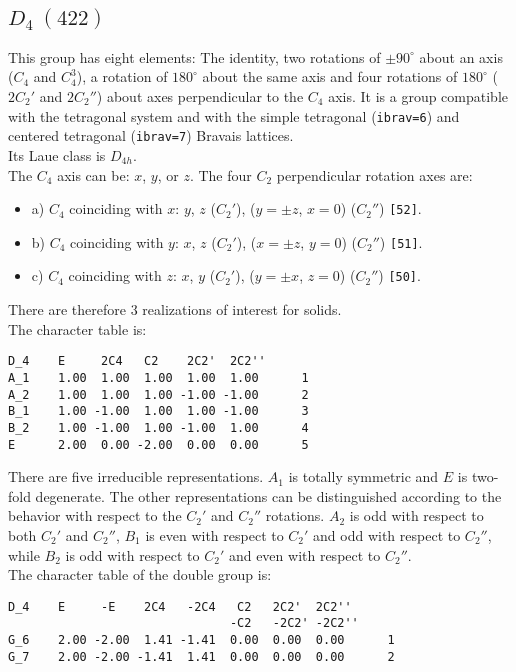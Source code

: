 \documentclass[12pt,a4paper]{article}
\begin{document}
\subsection{\color{web-blue}$D_4\ (422)$} 
This group has eight elements: The identity, two rotations of 
$\pm90^\circ$ about
an axis ($C_4$ and $C_4^3$), a rotation of $180^\circ$ about the same axis and
four rotations of $180^\circ$ ($2C_2'$ and $2C_2''$) about axes perpendicular 
to the $C_4$ axis. It is a group compatible with the tetragonal system and with the
simple tetragonal (\texttt{ibrav=6}) and centered tetragonal (\texttt{ibrav=7})
Bravais lattices. \\ 
Its Laue class is $D_{4h}$. \\
The $C_4$ axis can be: $x$, $y$, or $z$. The four $C_2$ perpendicular rotation
axes are: 
\begin{itemize}
\item
a) $C_4$ coinciding with $x$: $y$, $z$ ($C_2'$), ($y=\pm z$, $x=0$) ($C_2''$)
\texttt{[52]}.
\item
b) $C_4$ coinciding with $y$: $x$, $z$ ($C_2'$), ($x=\pm z$, $y=0$) ($C_2''$)
\texttt{[51]}.
\item
c) $C_4$ coinciding with $z$: $x$, $y$ ($C_2'$), ($y=\pm x$, $z=0$) ($C_2''$)
\texttt{[50]}.
\end{itemize}
There are therefore $3$ realizations of interest for solids. \\
The character table is:
\begin{verbatim}
D_4    E     2C4   C2    2C2'  2C2''
A_1    1.00  1.00  1.00  1.00  1.00      1
A_2    1.00  1.00  1.00 -1.00 -1.00      2
B_1    1.00 -1.00  1.00  1.00 -1.00      3
B_2    1.00 -1.00  1.00 -1.00  1.00      4
E      2.00  0.00 -2.00  0.00  0.00      5
\end{verbatim}
There are five irreducible representations. $A_1$ is totally symmetric 
and $E$ is two-fold degenerate. The other representations can be distinguished
according to the behavior with respect to the $C_2'$ and $C_2''$ rotations.
$A_2$ is odd with respect to both $C_2'$ and $C_2''$, $B_1$ is even with respect
to $C_2'$ and odd with respect to $C_2''$, while $B_2$ is odd with respect to
$C_2'$ and even with respect to $C_2''$. \\ 
The character table of the double group is:
\begin{verbatim}
D_4    E     -E    2C4   -2C4   C2   2C2'  2C2''
                               -C2   -2C2' -2C2''
G_6    2.00 -2.00  1.41 -1.41  0.00  0.00  0.00      1
G_7    2.00 -2.00 -1.41  1.41  0.00  0.00  0.00      2
\end{verbatim}
\end{document}
